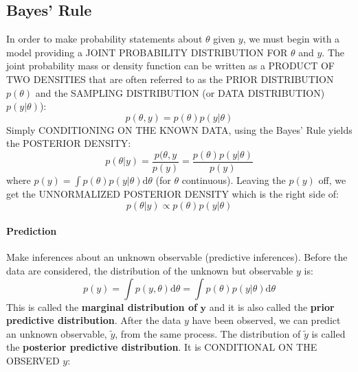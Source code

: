 \documentclass {article}
\begin{document}
\subsection {Bayes' Rule}
In order to make probability statements about $\theta$ given $y$, we must begin with a model providing a JOINT PROBABILITY DISTRIBUTION FOR $\theta$ and $y$. 
The joint probability mass or density function can be written as a PRODUCT OF TWO DENSITIES that are often referred to as the PRIOR DISTRIBUTION $p(\theta)$ and the SAMPLING DISTRIBUTION (or DATA DISTRIBUTION) $p(y| \theta)$): 
\begin{equation*}
p(\theta, y) = p(\theta)p(y | \theta)
\end{equation*}
Simply CONDITIONING ON THE KNOWN DATA, using the Bayes' Rule yields the POSTERIOR DENSITY:
\begin {equation*}
p(\theta | y) = \frac{p(\theta, y}{p(y)}= \frac{p(\theta)p(y | \theta)}{p(y)}
\end{equation*}  
where $p(y)= \int p(\theta) p(y| \theta) \mathrm{d} \theta$ (for $\theta$ continuous).
Leaving the $p(y)$ off, we get the UNNORMALIZED POSTERIOR DENSITY which is the right side of:
\begin{equation*}
p(\theta | y) \propto p(\theta)p(y|\theta)
\end{equation*}

\paragraph {Prediction}
Make inferences about an unknown observable (predictive inferences).
Before the data are considered, the distribution of the unknown but observable $y$ is:
\begin{equation*}
p(y) = \int p(y, \theta) \mathrm{d} \theta = \int p(\theta) p(y| \theta) \mathrm{d} \theta
\end{equation*}
This is called the \textbf{marginal distribution of} $\mathbf{y}$ and it is also called the \textbf{prior predictive distribution}.
After the data $y$ have been observed, we can predict an unknown observable, $\tilde{y}$, from the same process.
The distribution of $\tilde{y}$ is called the \textbf{posterior predictive distribution}. It is CONDITIONAL ON THE OBSERVED $y$:
\end{document}
